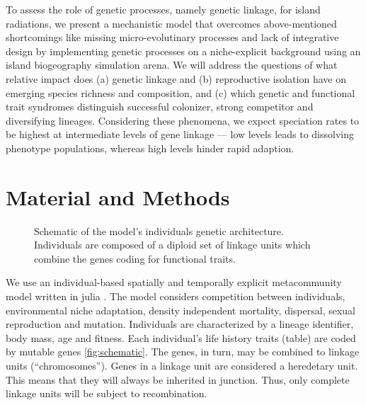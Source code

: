 \documentclass[a4paper]{scrartcl}
\begin{document}


To assess the role of genetic processes, namely genetic linkage, for island radiations,
we present a mechanistic model that overcomes above-mentioned shortcomings like missing micro-evolutinary processes and lack of integrative design
by implementing genetic processes on a niche-explicit background
using an island biogeography simulation arena.
We will address the questions of what relative impact does (a) genetic linkage and
(b) reproductive isolation have on emerging species richness and composition,
and (c) which genetic and functional trait syndromes %
distinguish successful colonizer,
strong competitor and diversifying lineages.
Considering these phenomena, we expect speciation rates to be highest at intermediate levels of gene linkage --- low
levels leads to dissolving phenotype populations, whereas high levels hinder rapid adaption. %


\section{Material and Methods}

\begin{figure}
  \caption{Schematic of the model's individuals genetic architecture.
    Individuals are composed of a diploid set of linkage units which combine the genes coding for functional traits.}
  \label{schematic}
\end{figure}

We use an individual-based spatially and temporally explicit metacommunity model written in julia \cite{bezansonJuliaFreshApproach2017}.
The model considers competition between individuals, environmental niche adaptation, density independent mortality,
dispersal, sexual reproduction and mutation.
Individuals are characterized by a lineage identifier,
body mass, age and fitness.
Each individual's life history traits (table) are coded by mutable genes \cref{fig:schematic}.
The genes, in turn, may be combined to linkage units (``chromosomes'').
Genes in a linkage unit are considered a heredetary unit.
This means that they will always be inherited in junction.
Thus, only complete linkage units will be subject to recombination.
\end{document}
